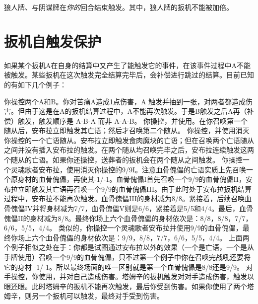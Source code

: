 狼人牌、与阴谋牌在\emph{你的}回合结束触发。其中，狼人牌的扳机不能被加倍。

\section{扳机自触发保护}
\label{self-triggering-protection}

如果某个扳机A在自身的结算中又产生了能触发它的事件，在该事件过程中A不能被触发。某些扳机在这次触发完全结算完毕后，会补偿进行跳过的结算。目前已知的有如下几个例子：

\example 你操控两个A和B。你对苦痛A造成1点伤害，A 触发并抽到一张，对两者都造成伤害。但由于这是在A的扳机结算过程中，A不能再次触发。于是B触发之后A再（补偿）触发，触发顺序是 A-B-A 而非 A-A-B。
\example 你操控，并使用。在你召唤第一个随从后，安布拉立即触发其亡语；然后才召唤第二个随从。
\example 你操控，并使用消灭你操控的一个亡语随从。安布拉立即触发食肉魔块的亡语；但在召唤两个亡语随从之间并没有插入安布拉的触发。在两个随从均召唤完毕之后，安布拉连续触发这两个随从的亡语。如果你还操控，送葬者的扳机会在两个随从之间触发。
\example 你操控一个灵魂歌者安布拉，使用消灭你操控的9/9I。注意血骨傀儡的亡语实质上先召唤一个原身材的血骨傀儡，再使其-1/-1。血骨傀儡I首先召唤一个9/9的血骨傀儡II，安布拉立即触发其亡语再召唤一个9/9的血骨傀儡III。由于此时处于安布拉扳机结算过程中，安布拉不能再次触发。血骨傀儡III的身材减为8/8。紧接着，后续召唤血骨傀儡IV并将身材减为7/7，血骨傀儡V则是6/6，紧接着是5/5和4/4。最后，血骨傀儡II的身材减为8/8。最终你场上六个血骨傀儡的身材依次是：8/8，8/8，7/7，6/6，5/5，4/4。
\example 类似的，你操控一个灵魂歌者安布拉并使用9/9的血骨傀儡，最终你场上六个血骨傀儡的身材依次是：9/9，8/8，7/7，6/6，5/5，4/4。
\notice 上面两个例子相似之处在于：你都是试图通过安布拉以外的效果（一个是亡语，一个是从手牌使用）召唤一个9/9的血骨傀儡，只不过第一个例子中你在召唤完战吼还要将它的身材 -1/-1。所以最终场面的唯一区别就是第一个血骨傀儡是8/8还是9/9。
\example 对手操控，你使用，并对自己造成伤害。塔姆辛的扳机触发对对手造成伤害，触发以眼还眼。此时塔姆辛的扳机不能再次触发，最后你受到伤害。如果你使用了两个塔姆辛，则另一个扳机可以触发，最终对手受到伤害。

